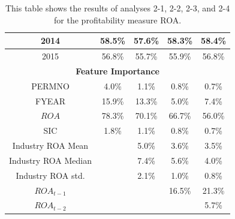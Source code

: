 {{\begin{table}[]
{\begin{tabular}{ccccc}
\multicolumn{1}{|c|}{2014}                & \multicolumn{1}{c|}{58.5\%}       & \multicolumn{1}{c|}{57.6\%}       & \multicolumn{1}{c|}{58.3\%}       & \multicolumn{1}{c|}{58.4\%}       \\ \hline
\multicolumn{1}{|c|}{2015}                & \multicolumn{1}{c|}{56.8\%}       & \multicolumn{1}{c|}{55.7\%}       & \multicolumn{1}{c|}{55.9\%}       & \multicolumn{1}{c|}{56.8\%}       \\ \hline
\multicolumn{5}{|c|}{\textbf{Feature Importance}}                                                                                                                                         \\ \hline
\multicolumn{1}{|c|}{PERMNO}              & \multicolumn{1}{c|}{4.0\%}        & \multicolumn{1}{c|}{1.1\%}        & \multicolumn{1}{c|}{0.8\%}        & \multicolumn{1}{c|}{0.7\%}        \\ \hline
\multicolumn{1}{|c|}{FYEAR}               & \multicolumn{1}{c|}{15.9\%}       & \multicolumn{1}{c|}{13.3\%}       & \multicolumn{1}{c|}{5.0\%}        & \multicolumn{1}{c|}{7.4\%}        \\ \hline
\multicolumn{1}{|c|}{$ROA$}               & \multicolumn{1}{c|}{78.3\%}       & \multicolumn{1}{c|}{70.1\%}       & \multicolumn{1}{c|}{66.7\%}       & \multicolumn{1}{c|}{56.0\%}       \\ \hline
\multicolumn{1}{|c|}{SIC}                 & \multicolumn{1}{c|}{1.8\%}        & \multicolumn{1}{c|}{1.1\%}        & \multicolumn{1}{c|}{0.8\%}        & \multicolumn{1}{c|}{0.7\%}        \\ \hline
\multicolumn{1}{|c|}{Industry ROA Mean}   & \multicolumn{1}{c|}{}             & \multicolumn{1}{c|}{5.0\%}        & \multicolumn{1}{c|}{3.6\%}        & \multicolumn{1}{c|}{3.5\%}        \\ \hline
\multicolumn{1}{|c|}{Industry ROA Median} & \multicolumn{1}{c|}{}             & \multicolumn{1}{c|}{7.4\%}        & \multicolumn{1}{c|}{5.6\%}        & \multicolumn{1}{c|}{4.0\%}        \\ \hline
\multicolumn{1}{|c|}{Industry ROA std.}   & \multicolumn{1}{c|}{}             & \multicolumn{1}{c|}{2.1\%}        & \multicolumn{1}{c|}{1.0\%}        & \multicolumn{1}{c|}{0.8\%}        \\ \hline
\multicolumn{1}{|c|}{$ROA_{t-1}$}         & \multicolumn{1}{c|}{}             & \multicolumn{1}{c|}{}             & \multicolumn{1}{c|}{16.5\%}       & \multicolumn{1}{c|}{21.3\%}       \\ \hline
\multicolumn{1}{|c|}{$ROA_{t-2}$}         & \multicolumn{1}{c|}{}             & \multicolumn{1}{c|}{}             & \multicolumn{1}{c|}{}             & \multicolumn{1}{c|}{5.7\%}        \\ \hline
\end{tabular}}
\caption{This table shows the results of analyses 2-1, 2-2, 2-3, and 2-4 for the profitability measure ROA.}
\label{tab:ROA-2}
\end{table}

}}
